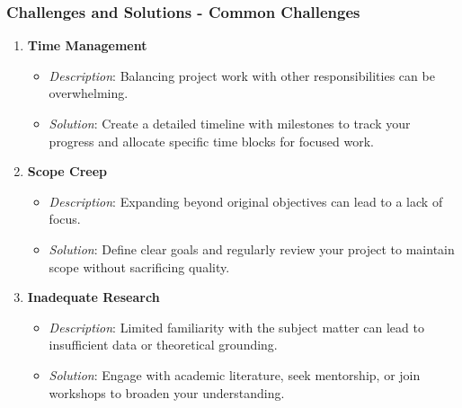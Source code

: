 \documentclass[aspectratio=169]{beamer}
\begin{document}
\begin{frame}[fragile]
    \frametitle{Challenges and Solutions - Common Challenges}
    \begin{enumerate}
        \item \textbf{Time Management}
        \begin{itemize}
            \item \textit{Description}: Balancing project work with other responsibilities can be overwhelming.
            \item \textit{Solution}: Create a detailed timeline with milestones to track your progress and allocate specific time blocks for focused work.
        \end{itemize}

        \item \textbf{Scope Creep}
        \begin{itemize}
            \item \textit{Description}: Expanding beyond original objectives can lead to a lack of focus.
            \item \textit{Solution}: Define clear goals and regularly review your project to maintain scope without sacrificing quality.
        \end{itemize}

        \item \textbf{Inadequate Research}
        \begin{itemize}
            \item \textit{Description}: Limited familiarity with the subject matter can lead to insufficient data or theoretical grounding.
            \item \textit{Solution}: Engage with academic literature, seek mentorship, or join workshops to broaden your understanding.
        \end{itemize}
    \end{enumerate}
\end{frame}
\end{document}
